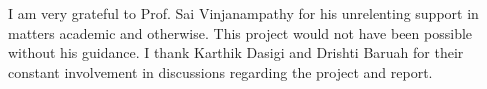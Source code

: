 
I am very grateful to Prof. Sai Vinjanampathy for his unrelenting support in
matters academic and otherwise. This project would not have been possible
without his guidance. I thank Karthik Dasigi and Drishti Baruah for their
constant involvement in discussions regarding the project and report.
